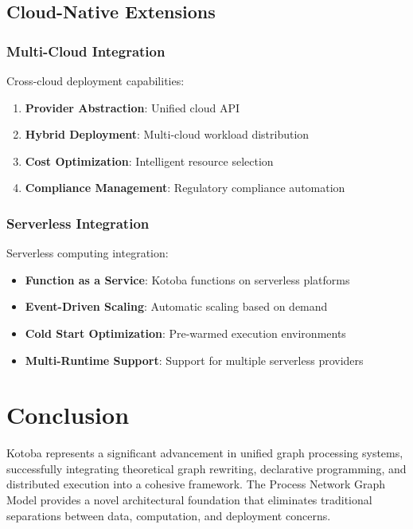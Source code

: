 \documentclass[11pt,a4paper]{article}
\begin{document}
\subsection{Cloud-Native Extensions}
\label{subsec:cloud_extensions}

\subsubsection{Multi-Cloud Integration}
\label{subsubsec:multi_cloud}

Cross-cloud deployment capabilities:

\begin{enumerate}
\item \textbf{Provider Abstraction}: Unified cloud API
\item \textbf{Hybrid Deployment}: Multi-cloud workload distribution
\item \textbf{Cost Optimization}: Intelligent resource selection
\item \textbf{Compliance Management}: Regulatory compliance automation
\end{enumerate}

\subsubsection{Serverless Integration}
\label{subsubsec:serverless}

Serverless computing integration:

\begin{itemize}
\item \textbf{Function as a Service}: Kotoba functions on serverless platforms
\item \textbf{Event-Driven Scaling}: Automatic scaling based on demand
\item \textbf{Cold Start Optimization}: Pre-warmed execution environments
\item \textbf{Multi-Runtime Support}: Support for multiple serverless providers
\end{itemize}

\section{Conclusion}
\label{sec:conclusion}

Kotoba represents a significant advancement in unified graph processing systems, successfully integrating theoretical graph rewriting, declarative programming, and distributed execution into a cohesive framework. The Process Network Graph Model provides a novel architectural foundation that eliminates traditional separations between data, computation, and deployment concerns.
\end{document}
